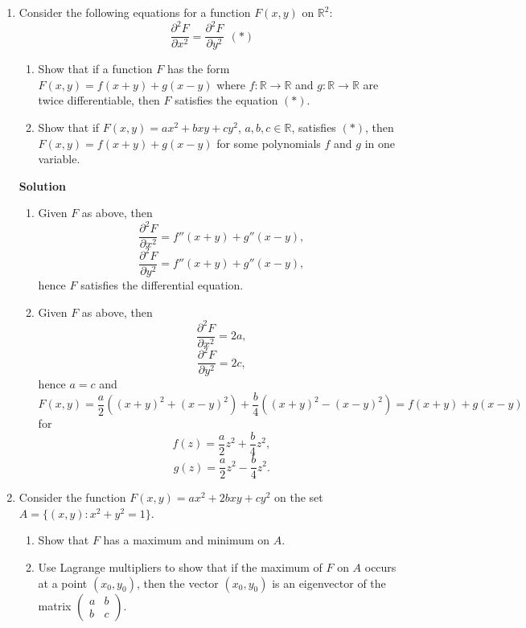 \documentclass{article}
\newcommand{\matrixiibyii}[4]{\left( \begin{array}{cc} #1 & #2 \\ #3 & #4 \end{array} \right)}
\begin{document}
\begin{enumerate}
\item Consider the following equations for a function \(F(x,y)\) on \(\mathbb{R}^2\):
\[\frac{\partial^2 F}{\partial x^2} = \frac{\partial^2 F}{\partial y^2} \ \ (*)\]

\begin{enumerate}
\item Show that if a function \(F\) has the form \(F(x,y) = f(x + y) + g(x - y)\) where \(f : \mathbb{R} \to \mathbb{R}\) and \(g : \mathbb{R} \to \mathbb{R}\) are twice differentiable, then \(F\) satisfies the equation \((*)\).

\item Show that if \(F(x,y) = ax^2 + bxy + cy^2\), \(a,b,c \in \mathbb{R}\), satisfies \((*)\), then \(F(x,y) = f(x + y) + g(x - y)\) for some polynomials \(f\) and \(g\) in one variable.

\end{enumerate}

{\bf Solution}

\begin{enumerate}
\item Given \(F\) as above, then
\[\frac{\partial^2 F}{\partial x^2} = f''(x + y) + g''(x - y),\]
\[\frac{\partial^2 F}{\partial y^2} = f''(x + y) + g''(x - y),\]
hence \(F\) satisfies the differential equation.

\item Given \(F\) as above, then
\[\frac{\partial^2 F}{\partial x^2} = 2a,\]
\[\frac{\partial^2 F}{\partial y^2} = 2c,\]
hence \(a = c\) and
\[F(x,y) = \frac{a}{2} \left( (x + y)^2 + (x - y)^2 \right)
         + \frac{b}{4} \left( (x + y)^2 - (x - y)^2 \right)
         = f(x + y) + g(x - y)\]
for
\[f(z) = \frac{a}{2} z^2 + \frac{b}{4} z^2,\]
\[g(z) = \frac{a}{2} z^2 - \frac{b}{4} z^2.\]

\end{enumerate}



\item Consider the function \(F(x,y) = ax^2 + 2bxy + cy^2\) on the set \(A = \{(x,y) : x^2 + y^2 = 1\}\).

\begin{enumerate}
\item Show that \(F\) has a maximum and minimum on \(A\).

\item Use Lagrange multipliers to show that if the maximum of \(F\) on \(A\) occurs at a point \((x_0, y_0)\), then the vector \((x_0, y_0)\) is an eigenvector of the matrix \(\matrixiibyii{a}{b}{b}{c}\).


\end{enumerate}
\end{enumerate}
\end{document}
